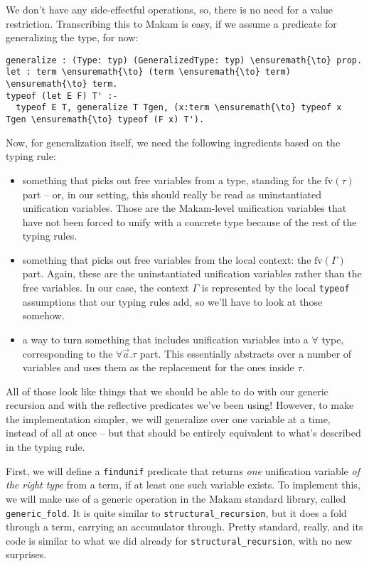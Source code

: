We don't have any side-effectful operations, so, there is no need for a
value restriction. Transcribing this to Makam is easy, if we assume a
predicate for generalizing the type, for now:

\begin{verbatim}
generalize : (Type: typ) (GeneralizedType: typ) \ensuremath{\to} prop.
let : term \ensuremath{\to} (term \ensuremath{\to} term) \ensuremath{\to} term.
typeof (let E F) T' :-
  typeof E T, generalize T Tgen, (x:term \ensuremath{\to} typeof x Tgen \ensuremath{\to} typeof (F x) T').
\end{verbatim}

Now, for generalization itself, we need the following ingredients based
on the typing rule:

\begin{itemize}
\tightlist
\item
  something that picks out free variables from a type, standing for the
  \(\text{fv}(\tau)\) part -- or, in our setting, this should really be
  read as uninstantiated unification variables. Those are the
  Makam-level unification variables that have not been forced to unify
  with a concrete type because of the rest of the typing rules.
\item
  something that picks out free variables from the local context: the
  \(\text{fv}(\Gamma)\) part. Again, these are the uninstantiated
  unification variables rather than the free variables. In our case, the
  context \(\Gamma\) is represented by the local \texttt{typeof}
  assumptions that our typing rules add, so we'll have to look at those
  somehow.
\item
  a way to turn something that includes unification variables into a
  \(\forall\) type, corresponding to the \(\forall \vec{a}.\tau\) part.
  This essentially abstracts over a number of variables and uses them as
  the replacement for the ones inside \(\tau\).
\end{itemize}

All of those look like things that we should be able to do with our
generic recursion and with the reflective predicates we've been using!
However, to make the implementation simpler, we will generalize over one
variable at a time, instead of all at once -- but that should be
entirely equivalent to what's described in the typing rule.

First, we will define a \texttt{findunif} predicate that returns
\emph{one} unification variable \emph{of the right type} from a term, if
at least one such variable exists. To implement this, we will make use
of a generic operation in the Makam standard library, called
\texttt{generic\_fold}. It is quite similar to
\texttt{structural\_recursion}, but it does a fold through a term,
carrying an accumulator through. Pretty standard, really, and its code
is similar to what we did already for \texttt{structural\_recursion},
with no new surprises.

